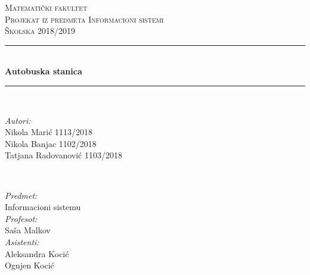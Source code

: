 \begin{titlepage}

\newcommand{\HRule}{\rule{\linewidth}{0.5mm}} %

\center %
 

\textsc{\LARGE Matematički fakultet}\\[1.5cm] %
\textsc{\Large Projekat iz predmeta Informacioni sistemi}\\[0.5cm] %
\textsc{\large Školska 2018/2019}\\[0.5cm] %


\HRule \\[0.4cm]
{ \huge \bfseries Autobuska stanica}\\[0.4cm] %
\HRule \\[2.cm]
 

\begin{minipage}{0.55\textwidth}
\begin{flushleft} \large
\emph{Autori:}\\
Nikola Mari\'c 1113/2018 \\%
Nikola Banjac 1102/2018 \\
Tatjana Radovanovi\'c 1103/2018
\end{flushleft}
\end{minipage}
~
\begin{minipage}{0.4\textwidth}
\begin{flushright} \large
\emph{Predmet:} \\
Informacioni sistemu\\%
\emph{Profesot:} \\
Sa\v sa Malkov\\
\emph{Asistenti:} \\
Aleksandra Koci\'c\\
Ognjen Koci\'c\\
\end{flushright}
\end{minipage}\\[4cm]


\end{titlepage}
